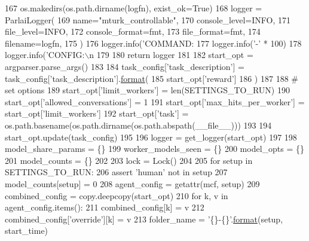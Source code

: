 \begin{DoxyCode}
{{167                 os.makedirs(os.path.dirname(logfn), exist\_ok=\textcolor{keyword}{True})
168         logger = ParlaiLogger(
169             name=\textcolor{stringliteral}{"mturk\_controllable"},
170             console\_level=INFO,
171             file\_level=INFO,
172             console\_format=fmt,
173             file\_format=fmt,
174             filename=logfn,
175         )
176         logger.info(\textcolor{stringliteral}{'COMMAND: %
177         logger.info(\textcolor{stringliteral}{'-'} * 100)
178         logger.info(\textcolor{stringliteral}{'CONFIG:\(\backslash\)n%
179 
180         \textcolor{keywordflow}{return} logger
181 
182     start\_opt = argparser.parse\_args()
183 
184     task\_config[\textcolor{stringliteral}{'task\_description'}] = task\_config[\textcolor{stringliteral}{'task\_description'}].\hyperlink{namespaceparlai_1_1chat__service_1_1services_1_1messenger_1_1shared__utils_a32e2e2022b824fbaf80c747160b52a76}{format}(
185         start\_opt[\textcolor{stringliteral}{'reward'}]
186     )
187 
188     \textcolor{comment}{# set options}
189     start\_opt[\textcolor{stringliteral}{'limit\_workers'}] = len(SETTINGS\_TO\_RUN)
190     start\_opt[\textcolor{stringliteral}{'allowed\_conversations'}] = 1
191     start\_opt[\textcolor{stringliteral}{'max\_hits\_per\_worker'}] = start\_opt[\textcolor{stringliteral}{'limit\_workers'}]
192     start\_opt[\textcolor{stringliteral}{'task'}] = os.path.basename(os.path.dirname(os.path.abspath(\_\_file\_\_)))
193 
194     start\_opt.update(task\_config)
195 
196     logger = get\_logger(start\_opt)
197 
198     model\_share\_params = \{\}
199     worker\_models\_seen = \{\}
200     model\_opts = \{\}
201     model\_counts = \{\}
202 
203     lock = Lock()
204 
205     \textcolor{keywordflow}{for} setup \textcolor{keywordflow}{in} SETTINGS\_TO\_RUN:
206         \textcolor{keyword}{assert} \textcolor{stringliteral}{'human'} \textcolor{keywordflow}{not} \textcolor{keywordflow}{in} setup
207         model\_counts[setup] = 0
208         agent\_config = getattr(mcf, setup)
209         combined\_config = copy.deepcopy(start\_opt)
210         \textcolor{keywordflow}{for} k, v \textcolor{keywordflow}{in} agent\_config.items():
211             combined\_config[k] = v
212             combined\_config[\textcolor{stringliteral}{'override'}][k] = v
213         folder\_name = \textcolor{stringliteral}{'\{\}-\{\}'}.\hyperlink{namespaceparlai_1_1chat__service_1_1services_1_1messenger_1_1shared__utils_a32e2e2022b824fbaf80c747160b52a76}{format}(setup, start\_time)
}}}}
\end{DoxyCode}

